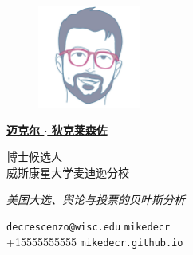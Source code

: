 \documentclass[10pt, oneside, final]{article}
\begin{document}
  \thispagestyle{empty}
  
  \begin{figure}
  \includegraphics[width = 0.3\textwidth]{img/circular-telles.png}
  \end{figure}

  \underline{\large\textsf{\textbf{迈克尔 $\cdot$ 狄克莱森佐}}}

  {博士候选人} \\
  {威斯康星大学麦迪逊分校}

  \emph{美国大选、舆论与投票的贝叶斯分析}

  \vfill 
  {\faEnvelope} \texttt{decrescenzo@wisc.edu} \hfill 
  {\faGithub} \texttt{mikedecr} \\
  {\faPhone} +1{\textendash}555{\textendash}555{\textendash}5555 \hfill 
  {\faGlobe} \texttt{mikedecr.github.io}
  
\end{document}
